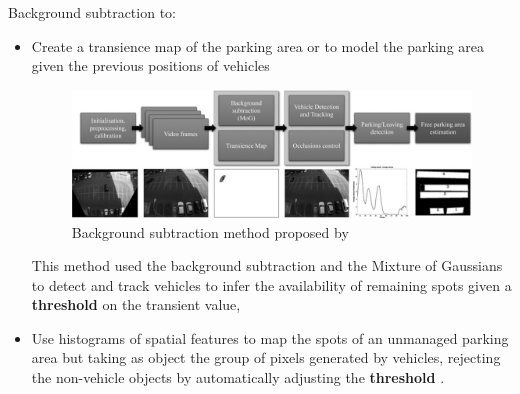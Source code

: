 \documentclass{beamer}
\begin{document}
\begin{frame}[allowframebreaks]
\begin{figure}[!htbp]
\begin{minipage}[b]{0.48\textwidth}
	\end{minipage}
\end{figure}
\vspace{5cm}
Background subtraction to:
\begin{itemize}
	\item Create a transience map of the parking area or to model the parking area given the previous positions of vehicles \cite{Postigo}
	\begin{figure}
		\includegraphics[width=300pt]{Pictures/transmap}
		\caption{Background subtraction method proposed by \cite{Postigo}}
	\end{figure}
	This method used the background subtraction and the Mixture of Gaussians to detect and track vehicles to infer the availability of remaining spots given a \textbf{threshold} on the transient value, 
	\item Use histograms of spatial features to map the spots of an unmanaged parking area but taking as object the group of pixels generated by vehicles, rejecting the non-vehicle objects by automatically adjusting the \textbf{threshold} \cite{Choeychuen}.
\end{itemize}


\end{frame}
\end{document}
